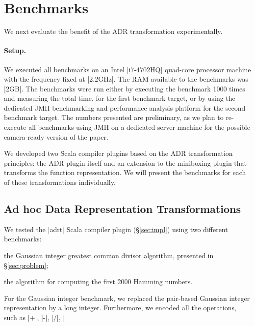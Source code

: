 \section{Benchmarks}
\label{sec:benchmarks}


We next evaluate the benefit of the ADR transformation experimentally.

\paragraph{Setup.} We executed all benchmarks on an Intel |i7-4702HQ| quad-core processor
machine with the frequency fixed at |2.2GHz|. The RAM available to the
benchmarks was |2GB|. The benchmarks were run either by executing the
benchmark 1000 times and measuring the total time, for the first
benchmark target, or by using the dedicated JMH benchmarking and
performance analysis platform \cite{aleksey_shipilev_openjdk:_????}
for the second benchmark target. The numbers presented are
preliminary, as we plan to re-execute all benchmarks using JMH on a
dedicated server machine for the possible camera-ready version of the paper.

We developed two Scala compiler plugins based on the ADR
transformation principles: the ADR plugin itself and an extension to
the miniboxing plugin \cite{miniboxing} that transforms the function
representation. We will present the benchmarks for each of these
transformations individually.

\subsection{Ad hoc Data Representation Transformations}
\label{sec:benchmarks:ad-hoc}

We tested the |adrt| Scala compiler plugin (\S\ref{sec:impl}) using two different benchmarks:

\begin{compactitem}
\item the Gaussian integer greatest common divisor algorithm, presented in \S\ref{sec:problem};
\item the algorithm for computing the first 2000 Hamming numbers.
\end{compactitem}

For the Gaussian integer benchmark, we replaced the pair-based Gaussian integer representation by a long integer. Furthermore, we encoded all the operations, such as |+|, |-|, |/|, |%

